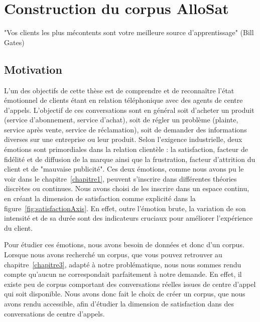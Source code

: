 \chapter{Construction du corpus AlloSat}
\label{chapitre4}
"Vos clients les plus mécontents sont votre meilleure source d’apprentissage" (Bill Gates)

\section{Motivation}
L'un des objectifs de cette thèse est de comprendre et de reconnaître l'état émotionnel de clients étant en relation téléphonique avec des agents de centre d'appels. L'objectif de ces conversations sont en général soit d'acheter un produit (service d'abonnement, service d'achat), soit de régler un problème (plainte, service après vente, service de réclamation), soit de demander des informations diverses sur une entreprise ou leur produit. Selon l'exigence industrielle, deux émotions sont primordiales dans la relation clientèle : la satisfaction, facteur de fidélité et de diffusion de la marque ainsi que la frustration, facteur d'attrition du client et de "mauvaise publicité". Ces deux émotions, comme nous avons pu le voir dans le chapitre~\ref{chapitre1}, peuvent s'inscrire dans différentes théories discrètes ou continues.
Nous avons choisi de les inscrire dans un espace continu, en créant la dimension de satisfaction comme explicité dans la figure~\ref{fig:satisfactionAxis}. En effet, outre l'émotion brute, la variation de son intensité et de sa durée sont des indicateurs cruciaux pour améliorer l'expérience du client.



Pour étudier ces émotions, nous avons besoin de données et donc d'un corpus.
Lorsque nous avons recherché un corpus, que vous pouvez retrouver au chapitre~\ref{chapitre3}, adapté à notre problématique, nous nous sommes rendu compte qu'aucun ne correspondait parfaitement à notre demande.
En effet, il existe peu de corpus comportant des conversations réelles issues de centre d'appel qui soit disponible. Nous avons donc fait le choix de créer un corpus, que nous avons rendu accessible, afin d'étudier la dimension de satisfaction dans des conversations de centre d'appels.



